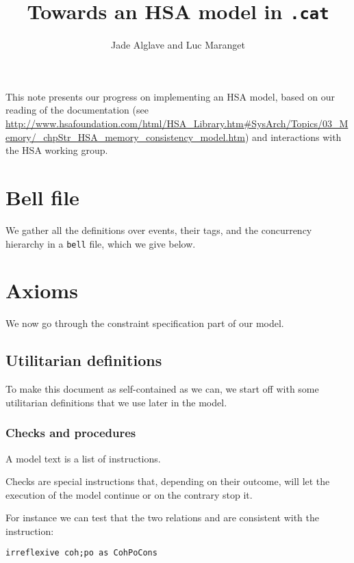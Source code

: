 \documentclass[a4paper]{article}
\begin{document}
\title{Towards an HSA model in {\tt .cat}}
\author{Jade Alglave and Luc Maranget}
\maketitle
\let\prog\textsf

This note presents our progress on implementing an HSA model, based on our
reading of the
documentation (see \url{http://www.hsafoundation.com/html/HSA_Library.htm#SysArch/Topics/03_Memory/_chpStr_HSA_memory_consistency_model.htm})
and interactions with the HSA working group.



\tableofcontents

\pagebreak



\section{Bell file \label{sec:bell}}

We gather all the definitions over events, their tags, and the concurrency
hierarchy in a {\tt bell} file, which we give below.



\pagebreak

\section{Axioms}

We now go through the constraint specification part of our model. 

\subsection{Utilitarian definitions}

To make this document as self-contained as we can, we start off with some
utilitarian definitions that we use later in the model. 

\subsubsection{\label{procedure}Checks and procedures}
A model text is a list of instructions.

Checks are special instructions that, depending on their outcome, will let the
execution of the model continue or on the contrary stop it.

For instance we can test that the two relations \coh{} and \po{} are consistent
with the instruction:
\begin{verbatim}
irreflexive coh;po as CohPoCons
\end{verbatim}
\end{document}
